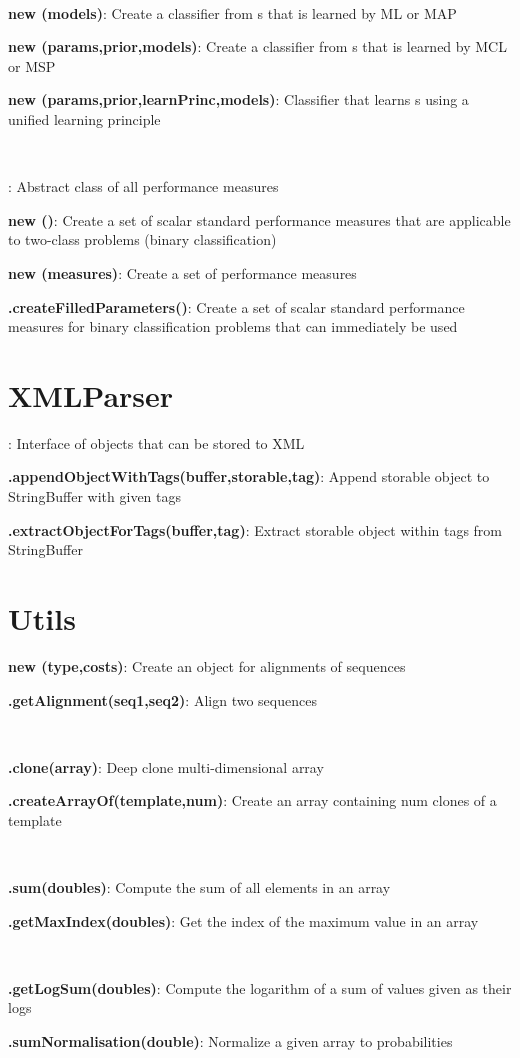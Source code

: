 \documentclass[10pt]{scrartcl}
\newcommand{\entry}[3]{{\bfseries #1#2}: #3}
\begin{document}
\begin{flushleft}
~

\entry{new \TrainSMBasedClassifier}{(models)}{Create a classifier from \TrainSM s that is learned by ML or MAP}

\entry{new \MSPClassifier}{(params,prior,models)}{Create a classifier from \DiffSM s that is learned by MCL or MSP}

\entry{new \GenDisMixClassifier}{(params,prior,learnPrinc,models)}{Classifier that learns \DiffSM s using a unified learning principle}

~

\entry{\AbstractPerformanceMeasure}{}{Abstract class of all performance measures}

\entry{new \NumericalPerformanceMeasureParameterSet}{()}{Create a set of scalar standard performance measures that are applicable to two-class problems (binary classification)}

\entry{new \PerformanceMeasureParameterSet}{(measures)}{Create a set of performance measures}

\entry{\PerformanceMeasureParameterSet}{.createFilledParameters()}{Create a set of scalar standard performance measures for binary classification problems that can immediately be used}

\section{XMLParser}

\entry{\Storable}{}{Interface of objects that can be stored to XML}

\entry{\XMLParser}{.appendObjectWithTags(buffer,storable,tag)}{Append storable object to StringBuffer with given tags}

\entry{\XMLParser}{.extractObjectForTags(buffer,tag)}{Extract storable object within tags from StringBuffer}

\section{Utils}

\entry{new \Alignment}{(type,costs)}{Create an object for alignments of sequences}

\entry{\Alignment}{.getAlignment(seq1,seq2)}{Align two sequences}

~

\entry{\ArrayHandler}{.clone(array)}{Deep clone multi-dimensional array}

\entry{\ArrayHandler}{.createArrayOf(template,num)}{Create an array containing num clones of a template}

~

\entry{\ToolBox}{.sum(doubles)}{Compute the sum of all elements in an array}

\entry{\ToolBox}{.getMaxIndex(doubles)}{Get the index of the maximum value in an array}

~

\entry{\Normalisation}{.getLogSum(doubles)}{Compute the logarithm of a sum of values given as their logs}

\entry{\Normalisation}{.sumNormalisation(double)}{Normalize a given array to probabilities}
\end{flushleft}
\end{document}
